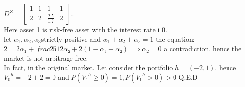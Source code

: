 \documentclass[12pt]{article}
\begin{document}
\begin{itemize}
  $D^{Z} =
 \left[\begin{array}{llll}
    1 & 1& 1 & 1 \\
    2 & 2& \frac{2.5}{1.2} & 2
    \end{array}
    \right]$..\\
    
Here asset 1 is risk-free asset with the interest rate i $0$.\\
let $\alpha_{1}, \alpha_{2}, \alpha_{3} $strictly positive and $\alpha_{1} +\alpha_{2}+ \alpha_{3}=1$
the equation:\\
$2 = 2\alpha_{1} +\ frac{25}{12}\alpha_{2} + 2(1- \alpha_{1} -\alpha_{2}) \implies \alpha_{2} = 0$  a contradiction. hence the market is not arbitrage free.\\

In fact, in the original market. Let consider the portfolio $h= (-2,1)$, hence ${V_{0}}^{h}= -2+2 = 0$ and $P({V_{1}}^{h} \geq 0) = 1, P({V_{1}}^{h} >0) >0$ Q.E.D
 


\end{itemize}
\end{document}
